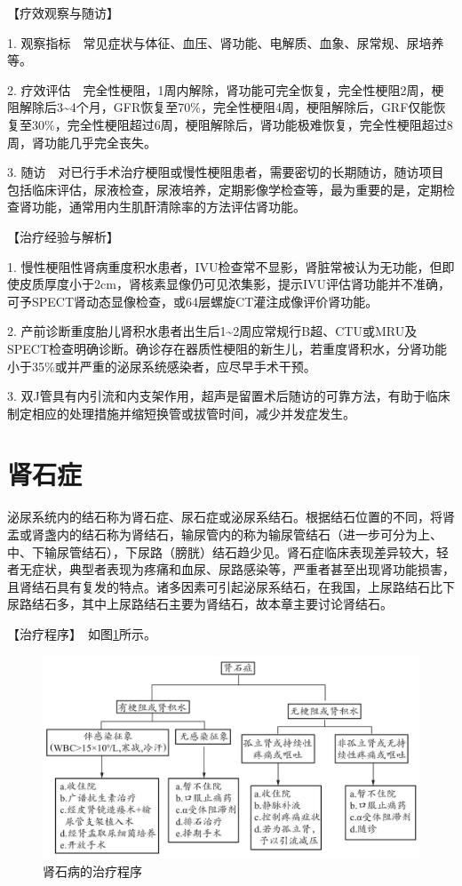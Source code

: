 【疗效观察与随访】

1.
观察指标　常见症状与体征、血压、肾功能、电解质、血象、尿常规、尿培养等。

2.
疗效评估　完全性梗阻，1周内解除，肾功能可完全恢复，完全性梗阻2周，梗阻解除后3\textasciitilde{}4个月，GFR恢复至70\%，完全性梗阻4周，梗阻解除后，GRF仅能恢复至30\%，完全性梗阻超过6周，梗阻解除后，肾功能极难恢复，完全性梗阻超过8周，肾功能几乎完全丧失。

3.
随访　对已行手术治疗梗阻或慢性梗阻患者，需要密切的长期随访，随访项目包括临床评估，尿液检查，尿液培养，定期影像学检查等，最为重要的是，定期检查肾功能，通常用内生肌酐清除率的方法评估肾功能。

【治疗经验与解析】

1.
慢性梗阻性肾病重度积水患者，IVU检查常不显影，肾脏常被认为无功能，但即使皮质厚度小于2cm，肾核素显像仍可见浓集影，提示IVU评估肾功能并不准确，可予SPECT肾动态显像检查，或64层螺旋CT灌注成像评价肾功能。

2.
产前诊断重度胎儿肾积水患者出生后1\textasciitilde{}2周应常规行B超、CTU或MRU及SPECT检查明确诊断。确诊存在器质性梗阻的新生儿，若重度肾积水，分肾功能小于35\%或并严重的泌尿系统感染者，应尽早手术干预。

3.
双J管具有内引流和内支架作用，超声是留置术后随访的可靠方法，有助于临床制定相应的处理措施并缩短换管或拔管时间，减少并发症发生。

\section{肾石症}

泌尿系统内的结石称为肾石症、尿石症或泌尿系结石。根据结石位置的不同，将肾盂或肾盏内的结石称为肾结石，输尿管内的称为输尿管结石（进一步可分为上、中、下输尿管结石），下尿路（膀胱）结石趋少见。肾石症临床表现差异较大，轻者无症状，典型者表现为疼痛和血尿、尿路感染等，严重者甚至出现肾功能损害，且肾结石具有复发的特点。诸多因素可引起泌尿系结石，在我国，上尿路结石比下尿路结石多，其中上尿路结石主要为肾结石，故本章主要讨论肾结石。

【治疗程序】　如图\ref{fig4-10-1}所示。

\begin{figure}[!htbp]
 \centering
 \includegraphics{./images/Image00133.jpg}
 \captionsetup{justification=centering}
 \caption{肾石病的治疗程序}
 \label{fig4-10-1}
  \end{figure} 

